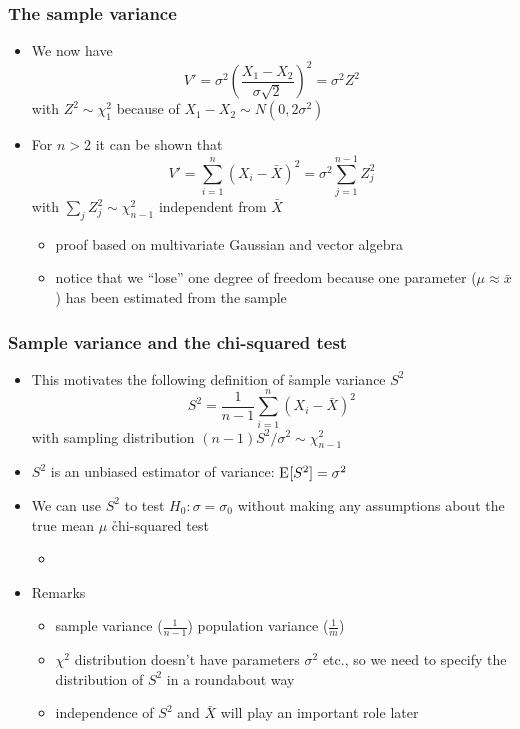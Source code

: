 \documentclass[t]{beamer} %
\begin{document}
\begin{frame}
  \frametitle{The sample variance}

  \begin{itemize}
  \item We now have
    \[
    V' = \sigma^2 \left( \frac{X_1 - X_2}{\sigma \sqrt{2}} \right)^2
    = \sigma^2 Z^2
    \]
    with $Z^2 \sim \chi^2_1$ because of $X_1 - X_2 \sim N(0, 2\sigma^2)$
    \pause
  \item For $n > 2$ it can be shown that
    \[
    V' = \sum_{i=1}^n (X_i - \bar{X})^2 = \sigma^2 \sum_{j=1}^{n-1} Z_j^2
    \]
    with $\sum_j Z_j^2 \sim \chi^2_{n-1}$ independent from $\bar{X}$
    \begin{itemize}
    \item proof based on multivariate Gaussian and vector algebra
    \item notice that we ``lose'' one degree of freedom because one
      parameter ($\mu \approx \bar{x}$) has been estimated from the sample
    \end{itemize}
  \end{itemize}
\end{frame}

\begin{frame}
  \frametitle{Sample variance and the chi-squared test}

  \begin{itemize}
  \item This motivates the following definition of \h{sample variance} $S^2$
    \[
    S^2 = \frac{1}{n-1} \sum_{i=1}^n (X_i - \bar{X})^2
    \]
    with sampling distribution $(n-1) S^2 / \sigma^2 \sim \chi^2_{n-1}$
  \item $S^2$ is an unbiased estimator of variance: $\mathrm{E}_{}[S^2] = \sigma^2$
    \pause
  \item We can use $S^2$ to test $H_0: \sigma = \sigma_0$ without making any
    assumptions about the true mean $\mu$ \so \h{chi-squared test}
    \begin{itemize}
    \item[]
    \end{itemize}
  \item Remarks
    \begin{itemize}
    \item sample variance ($\frac{1}{n-1}$) \vs population variance ($\frac{1}{m}$)
    \item $\chi^2$ distribution doesn't have parameters $\sigma^2$ etc., so we
      need to specify the distribution of $S^2$ in a roundabout way
    \item independence of $S^2$ and $\bar{X}$ will play an important role later
    \end{itemize}
  \end{itemize}
\end{frame}
\end{document}
